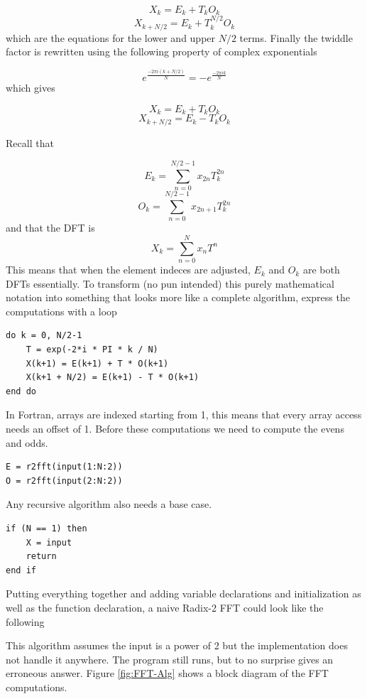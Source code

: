 $$X_k = E_k + T_kO_k$$  
$$X_{k+N/2} = E_k + T_k^{N/2}O_k$$
which are the equations for the lower and upper $N/2$ terms. Finally the twiddle factor is rewritten using the following property of complex exponentials

$$e^{\frac{-2\pi i(k+N/2)}{N}} = -e^{\frac{-2\pi ik}{N}}$$
which gives

$$X_k = E_k + T_kO_k$$  
$$X_{k+N/2} = E_k - T_kO_k$$

Recall that

$$E_k = \sum^{N/2-1}_{n=0} x_{2n}T_k^{2n}$$
$$O_k = \sum^{N/2-1}_{n=0} x_{2n+1}T_k^{2n}$$
and that the DFT is
$$X_k = \sum^{N}_{n=0} x_nT^{n}$$
This means that when the element indeces are adjusted, $E_k$ and $O_k$ are both DFTs essentially. To transform (no pun intended)  this purely mathematical notation into something that looks more like a complete algorithm, express the computations with a loop

\begin{lstlisting}
do k = 0, N/2-1
    T = exp(-2*i * PI * k / N) 
    X(k+1) = E(k+1) + T * O(k+1)
    X(k+1 + N/2) = E(k+1) - T * O(k+1)
end do
\end{lstlisting}
In Fortran, arrays are indexed starting from 1, this means that every array access needs an offset of 1. Before these computations we need to compute the evens and odds.
\begin{lstlisting}
E = r2fft(input(1:N:2))
O = r2fft(input(2:N:2))
\end{lstlisting}
Any recursive algorithm also needs a base case.
\begin{lstlisting}    
if (N == 1) then
    X = input
    return
end if
\end{lstlisting}
Putting everything together and adding variable declarations and initialization as well as the function declaration, a naive Radix-2 FFT could look like the following




This algorithm assumes the input is a power of 2 but the implementation does not handle it anywhere. The program still runs, but to no surprise gives an erroneous answer. Figure \ref{fig:FFT-Alg} shows a block diagram of the FFT computations.

